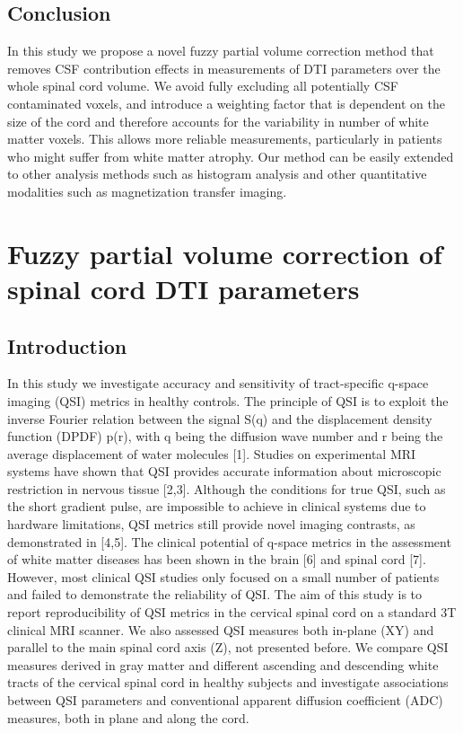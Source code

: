 \subsection*{Conclusion}
In this study we propose a novel fuzzy partial volume correction method that removes CSF contribution effects in measurements of DTI parameters over the whole spinal cord volume. We avoid fully excluding all potentially CSF contaminated voxels, and introduce a weighting factor that is dependent on the size of the cord and therefore accounts for the variability in number of white matter voxels. This allows more reliable measurements, particularly in patients who might suffer from white matter atrophy. Our method can be easily extended to other analysis methods such as histogram analysis and other quantitative modalities such as magnetization transfer imaging.

\section{Fuzzy partial volume correction of spinal cord DTI parameters}
\subsection*{Introduction}
In this study we investigate accuracy and sensitivity of tract-specific q-space imaging (QSI) metrics in healthy controls. The principle of QSI is to exploit the inverse Fourier relation between the signal S(q) and the displacement density function (DPDF) p(r), with q being the diffusion wave number and r being the average displacement of water molecules [1]. Studies on experimental MRI systems have shown that QSI provides accurate information about microscopic restriction in nervous tissue [2,3]. Although the conditions for true QSI, such as the short gradient pulse, are impossible to achieve in clinical systems due to hardware limitations, QSI metrics still provide novel imaging contrasts, as demonstrated in [4,5]. The clinical potential of q-space metrics in the assessment of white matter diseases has been shown in the brain [6] and spinal cord [7]. However, most clinical QSI studies only focused on a small number of patients and failed to demonstrate the reliability of QSI. The aim of this study is to report reproducibility of QSI metrics in the cervical spinal cord on a standard 3T clinical MRI scanner. We also assessed QSI measures both in-plane (XY) and parallel to the main spinal cord axis (Z), not presented before. We compare QSI measures derived in gray matter and different ascending and descending white tracts of the cervical spinal cord in healthy subjects and investigate associations between QSI parameters and conventional apparent diffusion coefficient (ADC) measures, both in plane and along the cord.                                          
